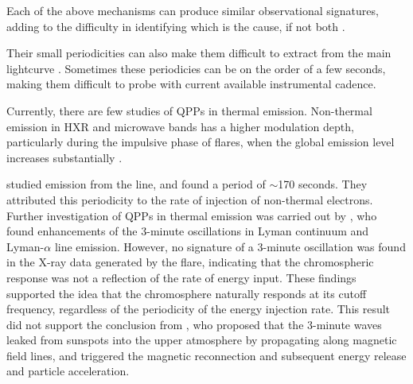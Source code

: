 Each of the above mechanisms can produce similar observational signatures,
adding to the difficulty in identifying which is the cause, if not both
\citep{Brosius2016}.


Their small periodicities can also make them difficult to extract from the main
lightcurve \citep{VanDoorsselaere2016}.
Sometimes these periodicies can be on the order of a few seconds, making
them difficult to probe with current available instrumental cadence.


Currently, there are few studies of QPPs in thermal emission.
Non-thermal emission in HXR and microwave bands has a higher modulation depth,
particularly during the impulsive phase of flares, when the global emission level
increases substantially
\citep{Hayes2016}.


\citep{Brosius2016} studied emission from the  line, and found
a period of $\sim$170 seconds. They
attributed this periodicity to the rate of injection of
non-thermal electrons.
Further investigation of QPPs in thermal emission was carried out by
\cite{Milligan2017}, who found enhancements of the 3-minute oscillations
in Lyman continuum and Lyman-$\alpha$ line emission.
However, no signature of a 3-minute oscillation was found in
the X-ray data generated by the flare, indicating
that the chromospheric response was not a
reflection of the rate of energy input.
These findings supported the idea that the chromosphere naturally
responds at its cutoff frequency, regardless of the periodicity of the
energy injection rate.
This result did not support the conclusion from
\cite{Sych2009}, who
proposed that the 3-minute waves leaked from sunspots into the upper
atmosphere by propagating along magnetic field lines, and triggered
the magnetic reconnection and subsequent energy release and particle
acceleration.


